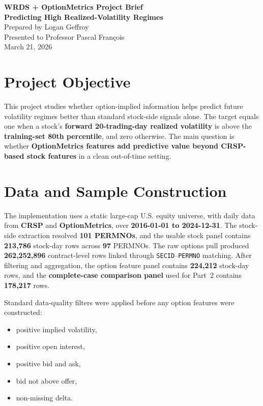 \documentclass[10pt]{article}
\begin{document}
\begin{center}
    {\Large \textbf{WRDS + OptionMetrics Project Brief}}\\[4pt]
    {\large \textbf{Predicting High Realized-Volatility Regimes}}\\[10pt]
    Prepared by Logan Geffroy\\
    Presented to Professor Pascal Fran\c{c}ois\\
    March 21, 2026
\end{center}

\small
\vspace{0.25em}

\section*{Project Objective}
This project studies whether option-implied information helps predict future volatility regimes better than standard stock-side signals alone. The target equals one when a stock's \textbf{forward 20-trading-day realized volatility} is above the \textbf{training-set 80th percentile}, and zero otherwise. The main question is whether \textbf{OptionMetrics features add predictive value beyond CRSP-based stock features} in a clean out-of-time setting.

\section*{Data and Sample Construction}
The implementation uses a static large-cap U.S. equity universe, with daily data from \textbf{CRSP} and \textbf{OptionMetrics}, over \textbf{2016-01-01 to 2024-12-31}. The stock-side extraction resolved \textbf{101 PERMNOs}, and the usable stock panel contains \textbf{213,786} stock-day rows across \textbf{97} PERMNOs. The raw options pull produced \textbf{262,252,896} contract-level rows linked through \texttt{SECID}--\texttt{PERMNO} matching. After filtering and aggregation, the option feature panel contains \textbf{224,212} stock-day rows, and the \textbf{complete-case comparison panel} used for Part~2 contains \textbf{178,217} rows.

Standard data-quality filters were applied before any option features were constructed:
\begin{itemize}
    \item positive implied volatility,
    \item positive open interest,
    \item positive bid and ask,
    \item bid not above offer,
    \item non-missing delta.
\end{itemize}
\end{document}
